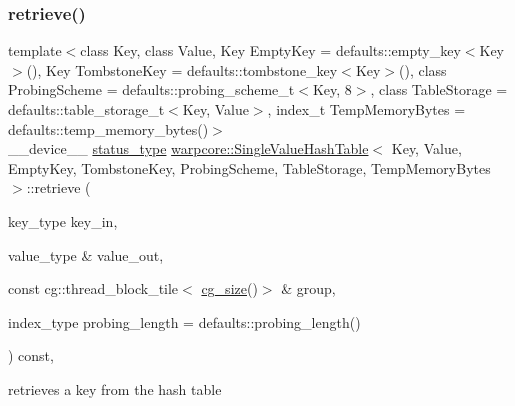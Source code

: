 \subsubsection{\texorpdfstring{retrieve()}{retrieve()}\hspace{0.1cm}{\footnotesize\ttfamily [1/3]}}
{\footnotesize\ttfamily template$<$class Key, class Value, Key Empty\+Key = defaults\+::empty\+\_\+key$<$\+Key$>$(), Key Tombstone\+Key = defaults\+::tombstone\+\_\+key$<$\+Key$>$(), class Probing\+Scheme = defaults\+::probing\+\_\+scheme\+\_\+t$<$\+Key, 8$>$, class Table\+Storage = defaults\+::table\+\_\+storage\+\_\+t$<$\+Key, Value$>$, index\+\_\+t Temp\+Memory\+Bytes = defaults\+::temp\+\_\+memory\+\_\+bytes()$>$ \\
\+\_\+\+\_\+device\+\_\+\+\_\+ \hyperlink{classwarpcore_1_1Status}{status\+\_\+type} \hyperlink{classwarpcore_1_1SingleValueHashTable}{warpcore\+::\+Single\+Value\+Hash\+Table}$<$ Key, Value, Empty\+Key, Tombstone\+Key, Probing\+Scheme, Table\+Storage, Temp\+Memory\+Bytes $>$\+::retrieve (\begin{DoxyParamCaption}\item[{key\+\_\+type}]{key\+\_\+in,  }\item[{value\+\_\+type \&}]{value\+\_\+out,  }\item[{const cg\+::thread\+\_\+block\+\_\+tile$<$ \hyperlink{classwarpcore_1_1SingleValueHashTable_aaa4cf7e3252a0b177101fca437e5309e}{cg\+\_\+size}()$>$ \&}]{group,  }\item[{index\+\_\+type}]{probing\+\_\+length = {\ttfamily defaults\+:\+:probing\+\_\+length()} }\end{DoxyParamCaption}) const\hspace{0.3cm}{\ttfamily [inline]}, {\ttfamily [noexcept]}}



retrieves a key from the hash table 


